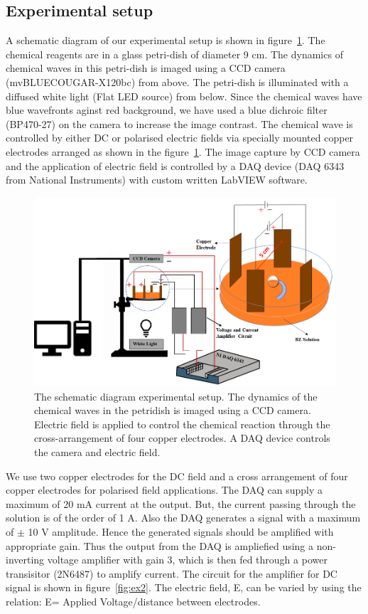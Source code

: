 \documentclass[journal=jacsat,manuscript=article]{achemso}
\begin{document}
\subsection{Experimental setup}
A schematic diagram of our experimental setup is shown in figure~\ref{fig:ex1}.
The chemical reagents are in a glass petri-dish of diameter 9 cm.
The dynamics of chemical waves in this petri-dish is imaged using a CCD camera (mvBLUECOUGAR-X120bc) from above. 
The petri-dish is illuminated with a diffused white light (Flat LED source) from below. Since the chemical waves have blue wavefronts aginst red background, we have used a  blue dichroic filter
(BP470-27) on the camera to increase the image contrast.
The chemical wave is controlled by either DC or polarised electric fields via specially mounted copper electrodes arranged as shown in the figure~\ref{fig:ex1}. The image capture by CCD camera and the application of electric field is controlled by a DAQ device (DAQ 6343 from National Instruments) with custom written LabVIEW software.
\begin{figure}[H]
    \centering
    \includegraphics[width=\linewidth]{expmt_new.png}
    \caption{The schematic diagram experimental setup.
      The dynamics of the chemical waves in the petridish is imaged using a CCD camera.
      Electric field is applied to control the chemical reaction through the cross-arrangement
      of four copper electrodes.
      A DAQ device controls the camera and electric field.}
    \label{fig:ex1}
\end{figure}

We use two copper electrodes for the DC field and a
cross arrangement of four copper electrodes for polarised field
applications. The DAQ can supply a maximum of 20 mA current at the
output. But, the current passing through the solution is of the order of 1 A.
Also the DAQ generates a signal with a maximum of $\pm$ 10 V amplitude. Hence the generated signals should be amplified with appropriate gain. Thus the output from the  DAQ is ampliefied using a non-inverting voltage amplifier with gain 3,
which is then fed through a power transisitor (2N6487) to amplify current.
The circuit for the amplifier for DC signal is shown in figure~{\ref{fig:ex2}}. The electric field, E, can be varied by using the relation: E= Applied Voltage/distance between electrodes.
\end{document}
